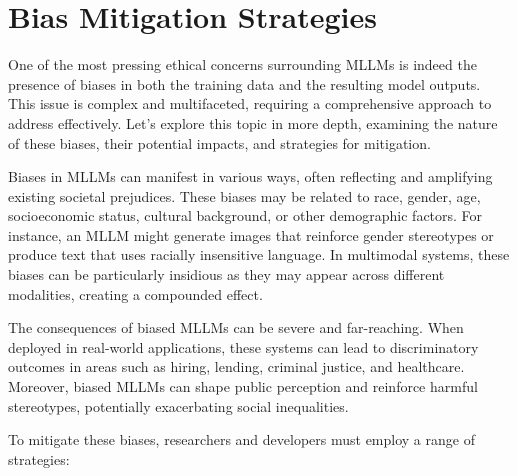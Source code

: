 \section{Bias Mitigation Strategies}

One of the most pressing ethical concerns surrounding MLLMs is indeed the presence of biases in both the training data and the resulting model outputs. This issue is complex and multifaceted, requiring a comprehensive approach to address effectively. Let's explore this topic in more depth, examining the nature of these biases, their potential impacts, and strategies for mitigation.

Biases in MLLMs can manifest in various ways, often reflecting and amplifying existing societal prejudices. These biases may be related to race, gender, age, socioeconomic status, cultural background, or other demographic factors. For instance, an MLLM might generate images that reinforce gender stereotypes or produce text that uses racially insensitive language. In multimodal systems, these biases can be particularly insidious as they may appear across different modalities, creating a compounded effect.

The consequences of biased MLLMs can be severe and far-reaching. When deployed in real-world applications, these systems can lead to discriminatory outcomes in areas such as hiring, lending, criminal justice, and healthcare. Moreover, biased MLLMs can shape public perception and reinforce harmful stereotypes, potentially exacerbating social inequalities.

To mitigate these biases, researchers and developers must employ a range of strategies:

